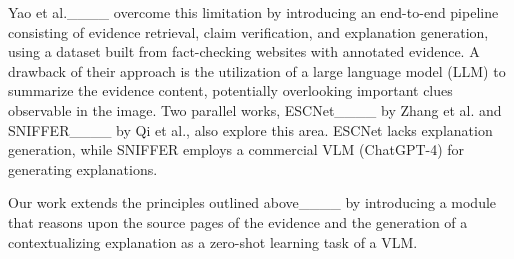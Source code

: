 Yao et al.____ overcome this limitation by introducing an end-to-end pipeline consisting of evidence retrieval, claim verification, and explanation generation, using a dataset built from fact-checking websites with annotated evidence. A drawback of their approach is the utilization of a large language model (LLM) to summarize the evidence content, potentially overlooking important clues observable in the image.
Two parallel works, ESCNet____ by Zhang et al. and SNIFFER____ by Qi et al., also explore this area. ESCNet lacks explanation generation, while SNIFFER employs a commercial VLM (ChatGPT-4) for generating explanations.

Our work extends the principles outlined above____ by introducing a module that reasons upon the source pages of the evidence and the generation of a contextualizing explanation as a zero-shot learning task of a VLM.